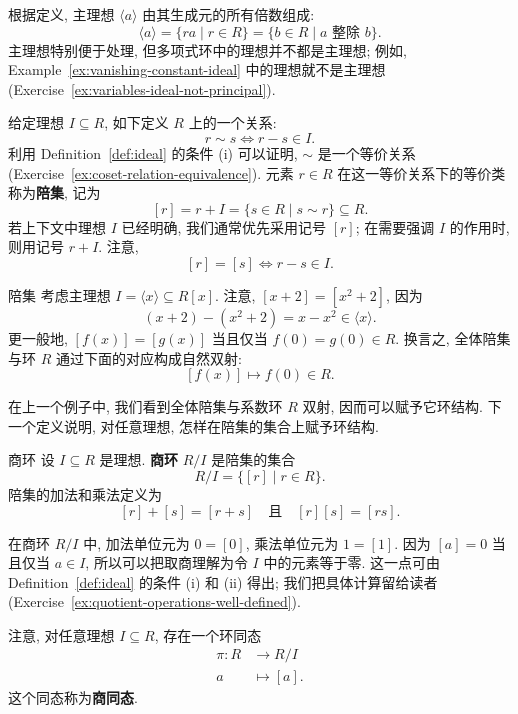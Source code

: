 根据定义, 主理想 $\langle a\rangle$ 由其生成元的所有倍数组成:
\[
  \langle a\rangle=\{ra\mid r\in R\}=\{b\in R\mid a\text{ 整除 }b\}.
\]
主理想特别便于处理, 但多项式环中的理想并不都是主理想; 例如, Example~\ref{ex:vanishing-constant-ideal} 中的理想就不是主理想 (Exercise~\ref{ex:variables-ideal-not-principal}).

给定理想 $I\subseteq R$, 如下定义 $R$ 上的一个关系:
\[
  r\sim s\iff r-s\in I.
\]
利用 Definition~\ref{def:ideal} 的条件 (i) 可以证明, $\sim$ 是一个等价关系 (Exercise~\ref{ex:coset-relation-equivalence}). 元素 $r\in R$ 在这一等价关系下的等价类称为\textbf{陪集}, 记为
\[
  [r]=r+I=\{s\in R\mid s\sim r\}\subseteq R.
\]
若上下文中理想 $I$ 已经明确, 我们通常优先采用记号 $[r]$; 在需要强调 $I$ 的作用时, 则用记号 $r+I$. 注意,
\[
  [r]=[s]\iff r-s\in I.
\]

\begin{Example}{陪集}\label{ex:cosets-of-variable-ideal}
  考虑主理想 $I=\langle x\rangle\subseteq R[x]$. 注意, $[x+2]=[x^{2}+2]$, 因为
  \[
    (x+2)-(x^{2}+2)=x-x^{2}\in\langle x\rangle.
  \]
  更一般地, $[f(x)]=[g(x)]$ 当且仅当 $f(0)=g(0)\in R$. 换言之, 全体陪集与环 $R$ 通过下面的对应构成自然双射:
  \[
    [f(x)]\longmapsto f(0)\in R.
  \]
\end{Example}

在上一个例子中, 我们看到全体陪集与系数环 $R$ 双射, 因而可以赋予它环结构. 下一个定义说明, 对任意理想, 怎样在陪集的集合上赋予环结构.

\begin{Definition}{商环}\label{def:quotient-ring}
  设 $I\subseteq R$ 是理想. \textbf{商环} $R/I$ 是陪集的集合
  \[
    R/I=\{[r]\mid r\in R\}.
  \]
  陪集的加法和乘法定义为
  \[
    [r]+[s]=[r+s]\quad\text{且}\quad[r][s]=[rs].
  \]
\end{Definition}

%
  {在商环 $R/I$ 中, 加法单位元为 $0=[0]$, 乘法单位元为 $1=[1]$. 因为 $[a]=0$ 当且仅当 $a\in I$, 所以可以把取商理解为\textquotedbl{}令 $I$ 中的元素等于零\textquotedbl{}.}
\noindent 这一点可由 Definition~\ref{def:ideal} 的条件 (i) 和 (ii) 得出; 我们把具体计算留给读者 (Exercise~\ref{ex:quotient-operations-well-defined}).

注意, 对任意理想 $I\subseteq R$, 存在一个环同态
\[
  \begin{aligned}
    \pi:R&\to R/I\\
    a&\mapsto[a].
  \end{aligned}
\]
这个同态称为\textbf{商同态}.

